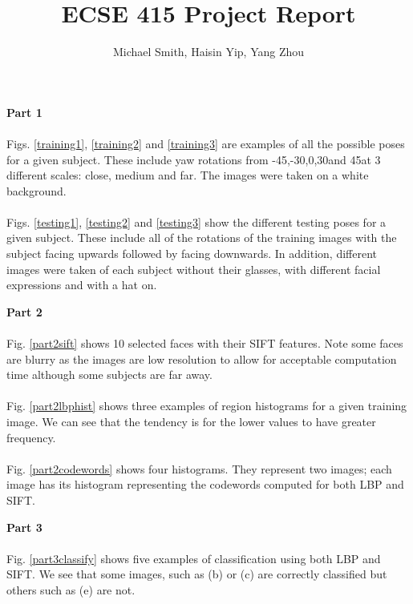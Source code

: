 \documentclass[10pt,letterpaper]{article}
\author{Michael Smith, Haisin Yip, Yang Zhou}
\title{ECSE 415 Project Report}
\begin{document}
\maketitle

\textbf{Part 1}
\vspace{5mm}
\paragraph{}
Figs. \ref{training1}, \ref{training2} and \ref{training3} are examples of all the possible poses for a given subject.  These include yaw rotations from -45\degree,-30\degree,0\degree,30\degree and 45\degree at 3 different scales: close, medium and far.  The images were taken on a white background.
\paragraph{}
Figs. \ref{testing1}, \ref{testing2} and \ref{testing3} show the different testing poses for a given subject.  These include all of the rotations of the training images with the subject facing upwards followed by facing downwards.  In addition, different images were taken of each subject without their glasses, with different facial expressions and with a hat on.

\vspace{5mm}
\textbf{Part 2}
\paragraph{}
Fig. \ref{part2sift} shows 10 selected faces with their SIFT features. Note some faces are blurry as the images are low resolution to allow for acceptable computation time although some subjects are far away.
\paragraph{}
Fig. \ref{part2lbphist} shows three examples of region histograms for a given training image.  We can see that the tendency is for the lower values to have greater frequency.
\paragraph{}
Fig. \ref{part2codewords} shows four histograms.  They represent two images; each image has its histogram representing the codewords computed for both LBP and SIFT.

\vspace{5mm}
\textbf{Part 3}
\paragraph{}
Fig. \ref{part3classify} shows five examples of classification using both LBP and SIFT. We see that some images, such as (b) or (c) are correctly classified but others such as (e) are not.
\end{document}
